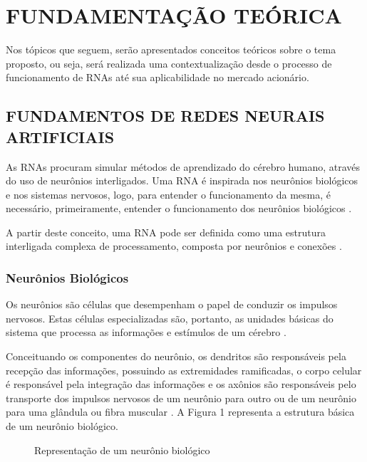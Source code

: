 
\chapter{FUNDAMENTAÇÃO TEÓRICA}\label{ch:fundaments-teorico}
Nos tópicos que seguem, serão apresentados conceitos teóricos sobre o tema proposto, ou seja, será realizada uma contextualização desde o processo de funcionamento de RNAs até sua aplicabilidade no mercado acionário.

\section{FUNDAMENTOS DE REDES NEURAIS ARTIFICIAIS}\label{sec:fundamentos}
As RNAs procuram simular métodos de aprendizado do cérebro humano, através do uso de neurônios interligados. Uma RNA é inspirada nos neurônios biológicos e nos sistemas nervosos, logo, para entender o funcionamento da mesma, é necessário, primeiramente, entender o funcionamento dos neurônios biológicos \cite{neto}.

A partir deste conceito, uma RNA pode ser definida como uma estrutura interligada complexa de processamento, composta por neurônios e conexões \cite{ferreira}.

\subsection{Neurônios Biológicos} 
Os neurônios são células que desempenham o papel de conduzir os impulsos nervosos. Estas células especializadas são, portanto, as unidades básicas do sistema que processa as informações e estímulos de um cérebro \cite{lent}. 

Conceituando os componentes do neurônio, os dendritos são responsáveis pela recepção das informações, possuindo as extremidades ramificadas, o corpo celular é responsável pela integração das informações e os axônios são responsáveis pelo transporte dos impulsos nervosos de um neurônio para outro ou de um neurônio para uma glândula ou fibra muscular \cite{lent}. A Figura 1 representa a estrutura básica de um neurônio biológico.

\begin{figure}[h]
	\centering
	\caption{Representação de um neurônio biológico}
	\label{exec-linearmente-separavel}
\end{figure} 


